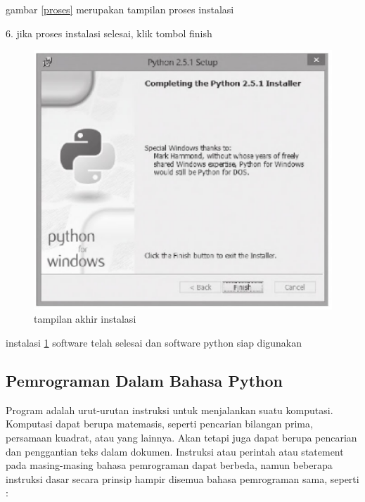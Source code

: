 \begin {enumerate}
	gambar \ref {proses} merupakan tampilan proses instalasi

	6. jika proses instalasi selesai, klik tombol finish
	
	\begin{figure}[ht]
	\centerline{\includegraphics[width=1\textwidth]{figures/selesai.PNG}}
	\caption{tampilan akhir instalasi}
	\label{selesai}
	\end{figure}
	
	instalasi \ref {selesai} software telah selesai dan software python siap digunakan
	
	\end {enumerate}

\subsection {Pemrograman Dalam Bahasa Python}
	Program adalah urut-urutan instruksi untuk menjalankan suatu komputasi. Komputasi dapat berupa matemasis, seperti
	pencarian bilangan prima, persamaan kuadrat, atau yang lainnya. Akan tetapi juga dapat berupa
	pencarian dan penggantian teks dalam dokumen. Instruksi atau perintah atau statement
	pada masing-masing bahasa pemrograman dapat berbeda, namun beberapa instruksi dasar
	secara prinsip hampir disemua bahasa pemrograman sama, seperti :
	
